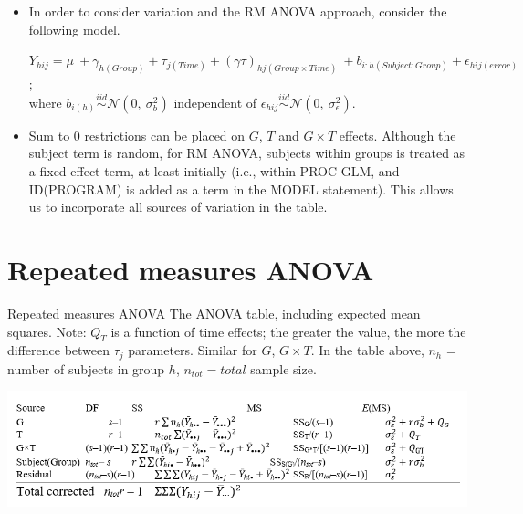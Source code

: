 \documentclass[
  9pt,
  ignorenonframetext,
]{beamer}
\begin{document}
\begin{frame}{}
\protect\hypertarget{section-1}{}
\begin{itemize}
\item
  In order to consider variation and the RM ANOVA approach, consider the
  following model.

  \(Y_{hij} = \mu \ + \gamma _{h(Group)} + \tau _{j(Time)} + (\gamma \tau )_{hj (Group \times Time)}\ + b_{i:h(Subject:Group)} + \epsilon _{hij(error)}\);\\
  where \(b_{i(h)} \stackrel {iid} \sim \mathcal N(0,\ \sigma _b^2)\)
  independent of
  \(\epsilon _{hij} \stackrel {iid} \sim \mathcal N(0,\  \sigma _\epsilon ^2)\).
\item
  Sum to \(0\) restrictions can be placed on \(G\), \(T\) and
  \(G \times T\) effects. Although the subject term is random, for RM
  ANOVA, subjects within groups is treated as a fixed-effect term, at
  least initially (i.e., within PROC GLM, and ID(PROGRAM) is added as a
  term in the MODEL statement). This allows us to incorporate all
  sources of variation in the table.
\end{itemize}
\end{frame}

\hypertarget{repeated-measures-anova}{%
\section{Repeated measures ANOVA}\label{repeated-measures-anova}}

\begin{frame}{Repeated measures ANOVA}
\protect\hypertarget{repeated-measures-anova-1}{}
The ANOVA table, including expected mean squares. Note: \(Q_T\) is a
function of time effects; the greater the value, the more the difference
between \(\tau_j\) parameters. Similar for \(G\), \(G \times T\). In the
table above, \(n_h\) = number of subjects in group \(h\),
\(n_{tot}=total\) sample size.

\includegraphics[width=1\linewidth]{figs_L4/f1}
\end{frame}
\end{document}
